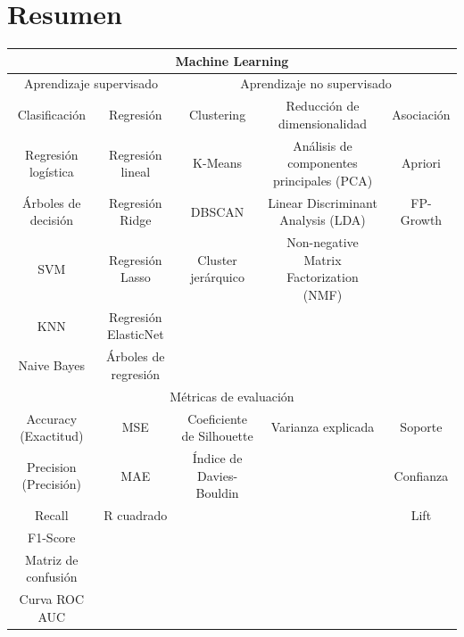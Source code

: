 \documentclass[a4paper, 12pt]{book}
\begin{document}
\section{Resumen}
\begin{table}[H]
	\resizebox{15cm}{!} {
	\begin{tabular}{|ccccc|}
		\hline
		\multicolumn{5}{|c|}{Machine Learning} \\ \hline
		\multicolumn{2}{|c|}{Aprendizaje supervisado} & \multicolumn{3}{c|}{Aprendizaje no supervisado} \\ \hline
		\multicolumn{1}{|c|}{Clasificación} & \multicolumn{1}{c|}{Regresión} & \multicolumn{1}{c|}{Clustering} & \multicolumn{1}{c|}{Reducción de dimensionalidad} & Asociación \\ \hline
		\multicolumn{1}{|c|}{Regresión logística} & \multicolumn{1}{c|}{Regresión lineal} & \multicolumn{1}{c|}{K-Means} & \multicolumn{1}{c|}{Análisis de componentes principales (PCA)} & Apriori \\ \hline
		\multicolumn{1}{|c|}{Árboles de decisión} & \multicolumn{1}{c|}{Regresión Ridge} & \multicolumn{1}{c|}{DBSCAN} & \multicolumn{1}{c|}{Linear Discriminant Analysis (LDA)} & FP-Growth \\ \hline
		\multicolumn{1}{|c|}{SVM} & \multicolumn{1}{c|}{Regresión Lasso} & \multicolumn{1}{c|}{Cluster jerárquico} & \multicolumn{1}{c|}{Non-negative Matrix Factorization (NMF)} &  \\ \hline
		\multicolumn{1}{|c|}{KNN} & \multicolumn{1}{c|}{Regresión ElasticNet} & \multicolumn{1}{c|}{} & \multicolumn{1}{c|}{} &  \\ \hline
		\multicolumn{1}{|c|}{Naive Bayes} & \multicolumn{1}{c|}{Árboles de regresión} & \multicolumn{1}{c|}{} & \multicolumn{1}{c|}{} &  \\ \hline
		\multicolumn{5}{|c|}{Métricas de evaluación} \\ \hline
		\multicolumn{1}{|c|}{Accuracy (Exactitud)} & \multicolumn{1}{c|}{MSE} & \multicolumn{1}{c|}{Coeficiente de Silhouette} & \multicolumn{1}{c|}{Varianza explicada} & Soporte \\ \hline
		\multicolumn{1}{|c|}{Precision (Precisión)} & \multicolumn{1}{c|}{MAE} & \multicolumn{1}{c|}{Índice de Davies-Bouldin} & \multicolumn{1}{c|}{} & Confianza \\ \hline
		\multicolumn{1}{|c|}{Recall} & \multicolumn{1}{c|}{R cuadrado} & \multicolumn{1}{c|}{} & \multicolumn{1}{c|}{} & Lift \\ \hline
		\multicolumn{1}{|c|}{F1-Score} & \multicolumn{1}{c|}{} & \multicolumn{1}{c|}{} & \multicolumn{1}{c|}{} &  \\ \hline
		\multicolumn{1}{|c|}{Matriz de confusión} & \multicolumn{1}{c|}{} & \multicolumn{1}{c|}{} & \multicolumn{1}{c|}{} &  \\ \hline
		\multicolumn{1}{|c|}{Curva ROC AUC} & \multicolumn{1}{c|}{} & \multicolumn{1}{c|}{} & \multicolumn{1}{c|}{} &  \\ \hline
	\end{tabular}
	}
\end{table}
\end{document}
